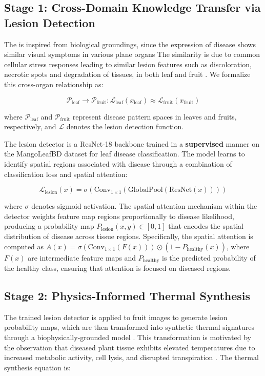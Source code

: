 \documentclass[utf8]{FrontiersinHarvard} %
\begin{document}
\subsection{Stage 1: Cross-Domain Knowledge Transfer via Lesion Detection}
The is inspired from biological groundings, since the expression of disease shows similar visual symptoms in various plane organs \cite{bock2010}The similarity is due to common cellular stress responses leading to similar lesion features such as discoloration, necrotic spots and degradation of tissues, in both leaf and fruit \cite{savary2019} . We formalize this cross-organ relationship as:

\begin{equation}
    \mathcal{P}_{\text{leaf}} \rightarrow \mathcal{P}_{\text{fruit}} : \mathcal{L}_{\text{leaf}}(x_{\text{leaf}}) \approx \mathcal{L}_{\text{fruit}}(x_{\text{fruit}})
    \label{eq:cross_domain}
\end{equation}

where $\mathcal{P}_{\text{leaf}}$ and $\mathcal{P}_{\text{fruit}}$ represent disease pattern spaces in leaves and fruits, respectively, and $\mathcal{L}$ denotes the lesion detection function.

The lesion detector is a ResNet-18 \cite{he2016} backbone trained in a \textbf{supervised} manner on the MangoLeafBD dataset for leaf disease classification. The model learns to identify spatial regions associated with disease through a combination of classification loss and spatial attention:

\begin{equation}
    \mathcal{L}_{\text{lesion}}(x) = \sigma(\text{Conv}_{1\times 1}(\text{GlobalPool}(\text{ResNet}(x))))
    \label{eq:lesion_detector}
\end{equation}

where $\sigma$ denotes sigmoid activation. The spatial attention mechanism within the detector weights feature map regions proportionally to disease likelihood, producing a probability map $P_{\text{lesion}}(x, y) \in [0, 1]$ that encodes the spatial distribution of disease across tissue regions. Specifically, the spatial attention is computed as $A(x) = \sigma(\text{Conv}_{1 \times 1}(F(x))) \odot (1 - P_{\text{healthy}}(x))$, where $F(x)$ are intermediate feature maps and $P_{\text{healthy}}$ is the predicted probability of the healthy class, ensuring that attention is focused on diseased regions.
\subsection{Stage 2: Physics-Informed Thermal Synthesis}
The trained lesion detector is applied to fruit images to generate lesion probability maps, which are then transformed into synthetic thermal signatures through a biophysically-grounded model \cite{raissi2019,karniadakis2021}. This transformation is motivated by the observation that diseased plant tissue exhibits elevated temperatures due to increased metabolic activity, cell lysis, and disrupted transpiration \cite{mahlein2016,pineda2021}. The thermal synthesis equation is:
\end{document}
